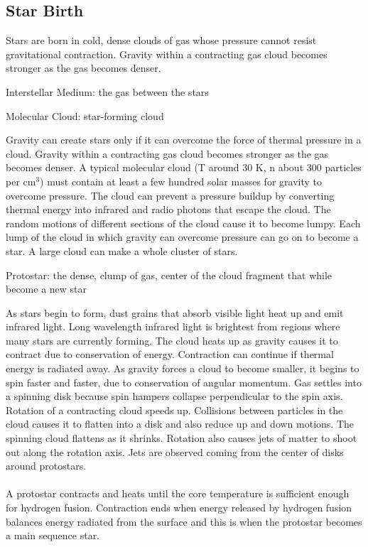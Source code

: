 \documentclass[12pt]{article}
\begin{document}
\subsection{Star Birth} 
Stars are born in cold, dense clouds of gas whose pressure cannot resist gravitational contraction. Gravity within a contracting gas cloud becomes stronger as the gas becomes denser. 
\begin{definition} Interstellar Medium: the gas between the stars \end{definition}
\begin{definition} Molecular Cloud: star-forming cloud \end{definition}
Gravity can create stars only if it can overcome the force of thermal pressure in a cloud. Gravity within a contracting gas cloud becomes stronger as the gas becomes denser. 
A typical molecular cloud (T around 30 K, n about 300 particles per cm$^3$) must contain at least a few hundred solar masses for gravity to overcome pressure. The cloud can prevent a pressure buildup by converting thermal energy into infrared and radio photons that escape the cloud. The random motions of different sections of the cloud cause it to become lumpy. Each lump of the cloud in which gravity can overcome pressure can go on to become a star. A large cloud can make a whole cluster of stars. 
\begin{definition} Protostar: the dense, clump of gas, center of the cloud fragment that while become a new star \end{definition}
As stars begin to form, dust grains that absorb visible light heat up and emit infrared light. Long wavelength infrared light is brightest from regions where many stars are currently forming. The cloud heats up as gravity causes it to contract due to conservation of energy. Contraction can continue if thermal energy is radiated away. As gravity forces a cloud to become smaller, it begins to spin faster and faster, due to conservation of angular momentum. Gas settles into a spinning disk because spin hampers collapse perpendicular to the spin axis. Rotation of a contracting cloud speeds up. Collisions between particles in the cloud causes it to flatten into a disk and also reduce up and down motions. The spinning cloud flattens as it shrinks. Rotation also causes jets of matter to shoot out along the rotation axis. Jets are observed coming from the center of disks around protostars. \\~\\
A protostar contracts and heats until the core temperature is sufficient enough for hydrogen fusion. Contraction ends when energy released by hydrogen fusion balances energy radiated from the surface and this is when the protostar becomes a main sequence star. \\~\\
\end{document}
